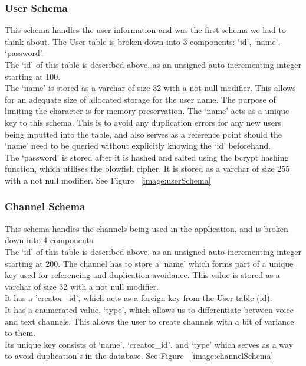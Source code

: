 \subsubsection{User Schema}
This schema handles the user information and was the first schema we had to think about. The User table is broken down into 3 components: ‘id’, ‘name’, ‘password’.
\\The ‘id’ of this table is described above, as an unsigned auto-incrementing integer starting at 100.
\\The ‘name’ is stored as a varchar of size 32 with a not-null modifier. This allows for an adequate size of allocated storage for the user name. The purpose of limiting the character is for memory preservation. The ‘name’ acts as a unique key to this schema. This is to avoid any duplication errors for any new users being inputted into the table, and also serves as a reference point should the ‘name’ need to be queried without explicitly knowing the ‘id’ beforehand. 
\\The ‘password’ is stored after it is hashed and salted using the bcrypt hashing function, which utilises the blowfish cipher. It is stored as a varchar of size 255 with a not null modifier.
See Figure ~\ref{image:userSchema}

\subsubsection{Channel Schema}
This schema handles the channels being used in the application, and is broken down into 4 components.
\\The ‘id’ of this table is described above, as an unsigned auto-incrementing integer starting at 200.
The channel has to store a ‘name’ which forms part of a unique key used for referencing and duplication avoidance. This value is stored as a varchar of size 32 with a not null modifier.
\\It has a 'creator\_id', which acts as a foreign key from the User table (id).
\\It has a enumerated value, ‘type’, which allows us to differentiate between voice and text channels. This allows the user to create channels with a bit of variance to them.
\\Its unique key consists of ‘name’, ‘creator\_id’, and ‘type’ which serves as a way to avoid duplication's in the database.
See Figure ~\ref{image:channelSchema}


